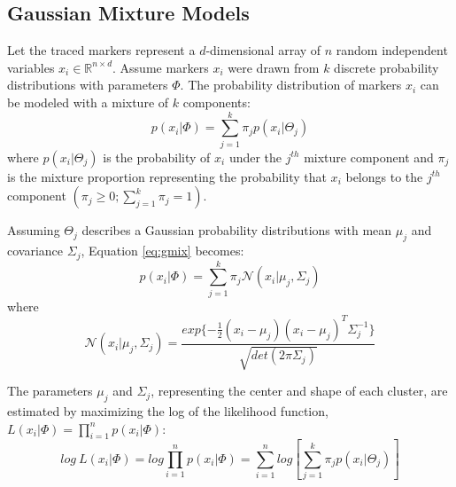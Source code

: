 \hypertarget{gmm}{%
\subsection{Gaussian Mixture Models}\label{gmm}}

Let the traced markers represent a \(d\)-dimensional array of \(n\) random independent variables \(x_i \in \mathbb{R}^{n \times d}\). Assume markers \(x_i\) were drawn from \(k\) discrete probability distributions with parameters \(\Phi\). The probability distribution of markers \(x_i\) can be modeled with a mixture of \(k\) components:
\begin{equation}
  p(x_i | \Phi) = \sum_{j=1}^k \pi_j p(x_i | \Theta_j)
  \label{eq:gmix}
\end{equation}
where \(p(x_i | \Theta_j)\) is the probability of \(x_i\) under the \(j^{th}\) mixture component and \(\pi_j\) is the mixture proportion representing the probability that \(x_i\) belongs to the \(j^{th}\) component \((\pi_j \geq 0; \sum_{j=1}^k \pi_j = 1)\).

Assuming \(\Theta_j\) describes a Gaussian probability distributions with mean \(\mu_j\) and covariance \(\Sigma_j\), Equation \eqref{eq:gmix} becomes:
\begin{equation}
  p(x_i | \Phi) = \sum_{j=1}^k \pi_j \mathcal{N}(x_i | \mu_j, \Sigma_j)
  \label{eq:mix}
\end{equation}
where
\begin{equation}
  \mathcal{N}(x_i | \mu_j, \Sigma_j) = \frac{exp\{ -\frac{1}{2}(x_i - \mu_j)(x_i - \mu_j)^T \Sigma_j^{-1}\}}{\sqrt{det(2 \pi \Sigma_j)}}
  \label{eq:gauss}
\end{equation}

The parameters \(\mu_j\) and \(\Sigma_j\), representing the center and shape of each cluster, are estimated by maximizing the log of the likelihood function, \(L(x_i | \Phi) = \prod_{i=1}^n p(x_i | \Phi)\):
\begin{equation}
  log~L(x_i | \Phi) = log \prod_{i=1}^n p(x_i | \Phi) = \sum_{i=1}^n log \left[ \sum_{j=1}^k \pi_j p(x_i | \Theta_j) \right]
  \label{eq:loglik}
\end{equation}

